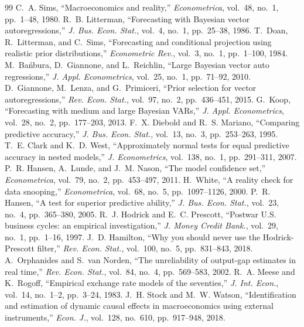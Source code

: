 \documentclass[conference]{IEEEtran}
\begin{document}
\begin{thebibliography}{99}
\small
{} C.~A. Sims, ``Macroeconomics and reality,'' \emph{Econometrica}, vol.~48, no.~1, pp.~1--48, 1980.
 R.~B. Litterman, ``Forecasting with Bayesian vector autoregressions,'' \emph{J. Bus. Econ. Stat.}, vol.~4, no.~1, pp.~25--38, 1986.
 T.~Doan, R.~Litterman, and C.~Sims, ``Forecasting and conditional projection using realistic prior distributions,'' \emph{Econometric Rev.}, vol.~3, no.~1, pp.~1--100, 1984.
 M.~Ba\'nbura, D.~Giannone, and L.~Reichlin, ``Large Bayesian vector auto regressions,'' \emph{J. Appl. Econometrics}, vol.~25, no.~1, pp.~71--92, 2010.
 D.~Giannone, M.~Lenza, and G.~Primiceri, ``Prior selection for vector autoregressions,'' \emph{Rev. Econ. Stat.}, vol.~97, no.~2, pp.~436--451, 2015.
 G.~Koop, ``Forecasting with medium and large Bayesian VARs,'' \emph{J. Appl. Econometrics}, vol.~28, no.~2, pp.~177--203, 2013.
 F.~X. Diebold and R.~S. Mariano, ``Comparing predictive accuracy,'' \emph{J. Bus. Econ. Stat.}, vol.~13, no.~3, pp.~253--263, 1995.
 T.~E. Clark and K.~D. West, ``Approximately normal tests for equal predictive accuracy in nested models,'' \emph{J. Econometrics}, vol.~138, no.~1, pp.~291--311, 2007.
 P.~R. Hansen, A.~Lunde, and J.~M. Nason, ``The model confidence set,'' \emph{Econometrica}, vol.~79, no.~2, pp.~453--497, 2011.
 H.~White, ``A reality check for data snooping,'' \emph{Econometrica}, vol.~68, no.~5, pp.~1097--1126, 2000.
 P.~R. Hansen, ``A test for superior predictive ability,'' \emph{J. Bus. Econ. Stat.}, vol.~23, no.~4, pp.~365--380, 2005.
 R.~J. Hodrick and E.~C. Prescott, ``Postwar U.S. business cycles: an empirical investigation,'' \emph{J. Money Credit Bank.}, vol.~29, no.~1, pp.~1--16, 1997.
 J.~D. Hamilton, ``Why you should never use the Hodrick-Prescott filter,'' \emph{Rev. Econ. Stat.}, vol.~100, no.~5, pp.~831--843, 2018.
 A.~Orphanides and S.~van Norden, ``The unreliability of output-gap estimates in real time,'' \emph{Rev. Econ. Stat.}, vol.~84, no.~4, pp.~569--583, 2002.
 R.~A. Meese and K.~Rogoff, ``Empirical exchange rate models of the seventies,'' \emph{J. Int. Econ.}, vol.~14, no.~1--2, pp.~3--24, 1983.
 J.~H. Stock and M.~W. Watson, ``Identification and estimation of dynamic causal effects in macroeconomics using external instruments,'' \emph{Econ. J.}, vol.~128, no.~610, pp.~917--948, 2018.

\end{thebibliography}
\end{document}
